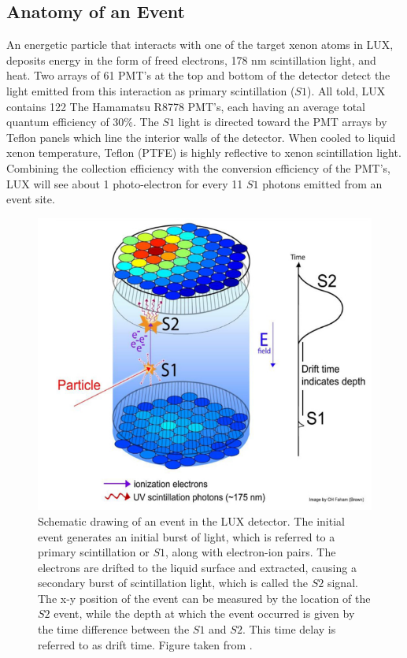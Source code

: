 \subsection{Anatomy of an Event}
An energetic particle that interacts with one of the target xenon atoms in LUX, deposits energy in the form of freed electrons, 178 nm scintillation light, and heat. Two arrays of 61 PMT's at the top and bottom of the detector detect the light emitted from this interaction as primary scintillation ($S1$). All told, LUX contains 122 The Hamamatsu R8778 PMT's, each having an average total quantum efficiency of 30\%. The $S1$ light is directed toward the PMT arrays by Teflon panels which line the interior walls of the detector. When cooled to liquid xenon temperature, Teflon (PTFE) is highly reflective to xenon scintillation light\cite{ptfe_ref}. Combining the collection efficiency with the conversion efficiency of the PMT's, LUX will see about 1 photo-electron for every 11 $S1$ photons emitted from an event site.
\begin{figure}[!h]
\centering
\includegraphics[width=150mm]{Figures/luxevent.png}
\caption{Schematic drawing of an event in the LUX detector. The initial event generates an initial burst of light, which is referred to a primary scintillation or $S1$, along with electron-ion pairs. The electrons are drifted to the liquid surface and extracted, causing a secondary burst of scintillation light, which is called the $S2$ signal. The x-y position of the event can be measured by the location of the $S2$ event, while the depth at which the event occurred is given by the time difference between the $S1$ and $S2$. This time delay is referred to as drift time. Figure taken from \cite{lux2012}.}
\label{fig:lux} 
\end{figure}

